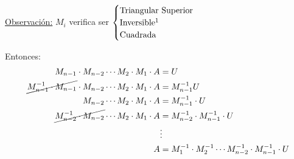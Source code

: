 \documentclass[]{article}
\begin{document}
\underline{Observación:}
$M_i$ verifica ser $\begin{cases}
\text{Triangular Superior}\\
\text{Inversible\footnotemark}\\
\text{Cuadrada}
\end{cases}$

Entonces:
\begin{align*}
	M_{n-1}\cdot M_{n-2} \cdots M_2 \cdot M_1 \cdot A &= U \\
	\cancel{M^{-1}_{n-1} \cdot M_{n-1}} \cdot M_{n-2} \cdots M_2 \cdot M_1 \cdot A &= M^{-1}_{n-1} U \\
	M_{n-2} \cdots M_2 \cdot M_1 \cdot A &= M^{-1}_{n-1} \cdot U \\
	\cancel{M_{n-2}^{-1} \cdot M_{n-2}} \cdots M_2 \cdot M_1 \cdot A &= M_{n-2}^{-1}\cdot M^{-1}_{n-1} \cdot U \\
	&\vdots\\
	A &= M_1^{-1} \cdot M_2^{-1} \cdots M^{-1}_{n-2}\cdot M^{-1}_{n-1} \cdot U\\
\end{align*}
\end{document}
